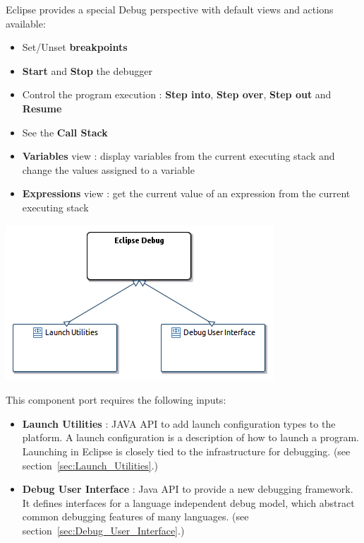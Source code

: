 \documentclass{gemoc} %
\begin{document}
Eclipse provides a special Debug perspective with default views and actions available:
\begin{itemize}
\item Set/Unset \textbf{breakpoints}
\item \textbf{Start} and \textbf{Stop} the debugger
\item Control the program execution : \textbf{Step into}, \textbf{Step over}, \textbf{Step out} and \textbf{Resume}
\item See the \textbf{Call Stack}
\item \textbf{Variables} view : display variables from the current executing stack and change the values assigned to a variable
\item \textbf{Expressions} view : get the current value of an expression from the current executing stack
\end{itemize}
\begin{center}
\includegraphics*[trim=0.0cm 0.0cm 0cm 0.0cm, clip=true]{../images/generated/Generated_Eclipse_Debug.png}
\end{center}

This component port requires the following inputs:
\begin{itemize}
  \item \textbf{Launch Utilities} :
JAVA API to add launch configuration types to the platform. A launch configuration is a description of how to launch a program. Launching in Eclipse is closely tied to the infrastructure for debugging.
(see section~\ref{sec:Launch_Utilities}.)
  \item \textbf{Debug User Interface} :
Java API to provide a new debugging framework. It defines interfaces for a language independent debug model, which abstract common debugging features of many languages. 
(see section~\ref{sec:Debug_User_Interface}.)
\end{itemize}
\end{document}
